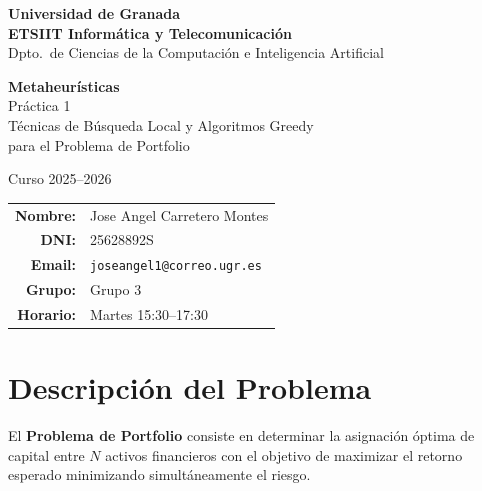 \documentclass[12pt,a4paper]{article}
\begin{document}
\begin{titlepage}
  \centering
  \vspace*{2cm}
  {\Large \textbf{Universidad de Granada}\\[0.3cm]
          \textbf{ETSIIT Informática y Telecomunicación}\\[0.3cm]
          Dpto.\ de Ciencias de la Computación e Inteligencia Artificial}

  \vspace{2.5cm}
  {\LARGE \textbf{Metaheurísticas}}\\[0.5cm]
  {\Large Práctica 1}\\[0.3cm]
  {\large Técnicas de Búsqueda Local y Algoritmos Greedy\\
           para el Problema de Portfolio}

  \vspace{1.5cm}
  {\large Curso 2025--2026}

  \vfill
  \begin{tabular}{rl}
    \textbf{Nombre:}  & Jose Angel Carretero Montes \\[4pt]
    \textbf{DNI:}     & 25628892S \\[4pt]
    \textbf{Email:}   & \texttt{joseangel1@correo.ugr.es} \\[4pt]
    \textbf{Grupo:}   & Grupo 3 \\[4pt]
    \textbf{Horario:} & Martes 15:30--17:30 \\
  \end{tabular}
  \vspace{1.5cm}
\end{titlepage}

\tableofcontents
\newpage

\section{Descripción del Problema}

El \textbf{Problema de Portfolio} consiste en determinar la asignación óptima de capital
entre $N$ activos financieros con el objetivo de maximizar el retorno esperado
minimizando simultáneamente el riesgo.
\end{document}
